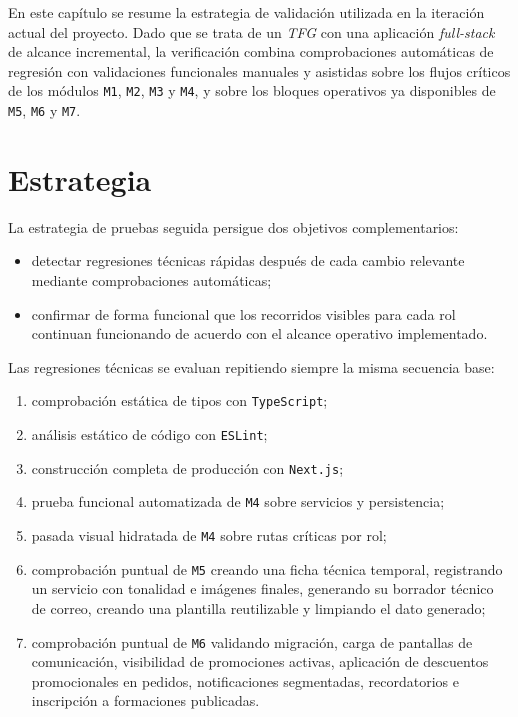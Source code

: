 En este capítulo se resume la estrategia de validación utilizada en la iteración actual del proyecto. Dado que se trata de un \textit{TFG} con una aplicación \textit{full-stack} de alcance incremental, la verificación combina comprobaciones automáticas de regresión con validaciones funcionales manuales y asistidas sobre los flujos críticos de los módulos \texttt{M1}, \texttt{M2}, \texttt{M3} y \texttt{M4}, y sobre los bloques operativos ya disponibles de \texttt{M5}, \texttt{M6} y \texttt{M7}.

\section{Estrategia}

La estrategia de pruebas seguida persigue dos objetivos complementarios:

\begin{itemize}
    \item detectar regresiones técnicas rápidas después de cada cambio relevante mediante comprobaciones automáticas;
    \item confirmar de forma funcional que los recorridos visibles para cada rol continuan funcionando de acuerdo con el alcance operativo implementado.
\end{itemize}

Las regresiones técnicas se evaluan repitiendo siempre la misma secuencia base:

\begin{enumerate}
    \item comprobación estática de tipos con \texttt{TypeScript};
    \item análisis estático de código con \texttt{ESLint};
    \item construcción completa de producción con \texttt{Next.js};
    \item prueba funcional automatizada de \texttt{M4} sobre servicios y persistencia;
    \item pasada visual hidratada de \texttt{M4} sobre rutas críticas por rol;
    \item comprobación puntual de \texttt{M5} creando una ficha técnica temporal, registrando un servicio con tonalidad e imágenes finales, generando su borrador técnico de correo, creando una plantilla reutilizable y limpiando el dato generado;
    \item comprobación puntual de \texttt{M6} validando migración, carga de pantallas de comunicación, visibilidad de promociones activas, aplicación de descuentos promocionales en pedidos, notificaciones segmentadas, recordatorios e inscripción a formaciones publicadas.
\end{enumerate}

